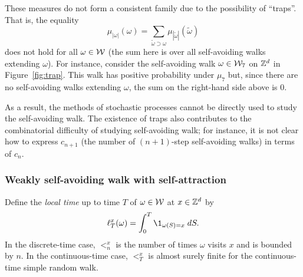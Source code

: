 These measures do not form a consistent family due to the possibility of ``traps''.
That is, the equality
\begin{equation}
\mu_{|\omega|}(\omega) = \sum_{\tilde\omega \supset \omega} \mu_{|\tilde\omega|}(\tilde\omega)
\end{equation}
does not hold for all $\omega\in\mathcal{W}$ (the sum here is over all self-avoiding walks extending
$\omega$).
For instance, consider the self-avoiding walk $\omega\in\mathcal{W}_7$ on ${ {{\mathbb Z}}^d }$ in
Figure~\ref{fig:trap}.
This walk has positive probability under $\mu_7$ but,
since there are no self-avoiding walks extending $\omega$, the sum on the right-hand side
above is $0$.

As a result, the methods of stochastic processes cannot be directly used to study the self-avoiding
walk. The existence of traps also contributes to the combinatorial difficulty of studying
self-avoiding walk; for instance, it is not clear how to express $c_{n+1}$ (the number of
$(n+1)$-step self-avoiding walks) in terms of $c_n$.



\subsubsection{Weakly self-avoiding walk with self-attraction}

Define the \emph{local time} up to time $T$ of $\omega \in \mathcal{W}$ at $x \in { {{\mathbb Z}}^d }$ by
\begin{equation}
\lt^x_T(\omega) = \int_0^T \1_{\omega(S)=x} \; dS.
\end{equation}
In the discrete-time case, $\lt^x_n$ is the number of times $\omega$ visits $x$
and is bounded by $n$. In the continuous-time case, $\lt^x_T$ is almost surely
finite for the continuous-time simple random walk.

